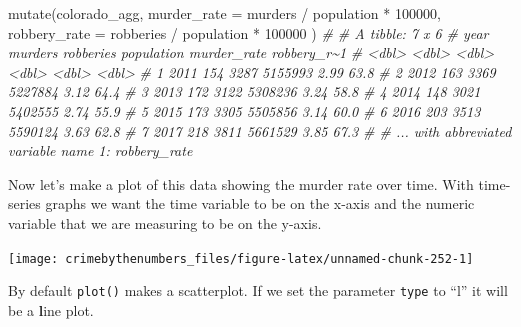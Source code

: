 \documentclass[
]{krantz}
\makeatletter
\newenvironment{Shaded}{\begin{snugshade}}{\end{snugshade}}
\newcommand{\AttributeTok}[1]{\textcolor[rgb]{0.61,0.61,0.61}{#1}}
\newcommand{\CommentTok}[1]{\textcolor[rgb]{0.37,0.37,0.37}{\textit{#1}}}
\newcommand{\DecValTok}[1]{\textcolor[rgb]{0.06,0.06,0.06}{#1}}
\newcommand{\FunctionTok}[1]{\textcolor[rgb]{0,0,0}{#1}}
\newcommand{\NormalTok}[1]{#1}
\newcommand{\SpecialCharTok}[1]{\textcolor[rgb]{0,0,0}{#1}}
\newenvironment{kframe}{%
\medskip{}
\setlength{\fboxsep}{.8em}
 \def\at@end@of@kframe{}%
 \ifinner\ifhmode%
  \def\at@end@of@kframe{\end{minipage}}%
  \begin{minipage}{\columnwidth}%
 \fi\fi%
 \def\FrameCommand##1{\hskip\@totalleftmargin \hskip-\fboxsep
 \colorbox{shadecolor}{##1}\hskip-\fboxsep
     \hskip-\linewidth \hskip-\@totalleftmargin \hskip\columnwidth}%
 \MakeFramed {\advance\hsize-\width
   \@totalleftmargin\z@ \linewidth\hsize
   \@setminipage}}%
 {\par\unskip\endMakeFramed%
 \at@end@of@kframe}
\renewenvironment{Shaded}{\begin{kframe}}{\end{kframe}}
\makeatother
\begin{document}
\begin{Shaded}
\begin{Highlighting}[]
\FunctionTok{mutate}\NormalTok{(colorado\_agg,}
  \AttributeTok{murder\_rate  =}\NormalTok{ murders }\SpecialCharTok{/}\NormalTok{ population }\SpecialCharTok{*} \DecValTok{100000}\NormalTok{,}
  \AttributeTok{robbery\_rate =}\NormalTok{ robberies }\SpecialCharTok{/}\NormalTok{ population }\SpecialCharTok{*} \DecValTok{100000}
\NormalTok{)}
\CommentTok{\# \# A tibble: 7 x 6}
\CommentTok{\#    year murders robberies population murder\_rate robbery\_r\textasciitilde{}1}
\CommentTok{\#   \textless{}dbl\textgreater{}   \textless{}dbl\textgreater{}     \textless{}dbl\textgreater{}      \textless{}dbl\textgreater{}       \textless{}dbl\textgreater{}       \textless{}dbl\textgreater{}}
\CommentTok{\# 1  2011     154      3287    5155993        2.99        63.8}
\CommentTok{\# 2  2012     163      3369    5227884        3.12        64.4}
\CommentTok{\# 3  2013     172      3122    5308236        3.24        58.8}
\CommentTok{\# 4  2014     148      3021    5402555        2.74        55.9}
\CommentTok{\# 5  2015     173      3305    5505856        3.14        60.0}
\CommentTok{\# 6  2016     203      3513    5590124        3.63        62.8}
\CommentTok{\# 7  2017     218      3811    5661529        3.85        67.3}
\CommentTok{\# \# ... with abbreviated variable name 1: robbery\_rate}
\end{Highlighting}
\end{Shaded}

Now let's make a plot of this data showing the murder rate
over time. With time-series graphs we want the time variable
to be on the x-axis and the numeric variable that we are
measuring to be on the y-axis.

\begin{Shaded}
\end{Shaded}

\begin{center}\texttt{[image: crimebythenumbers\_files/figure-latex/unnamed-chunk-252-1]} \end{center}

By default \texttt{plot()} makes a scatterplot. If we set
the parameter \texttt{type} to ``l'' it will be a
\textbf{l}ine plot.
\end{document}

